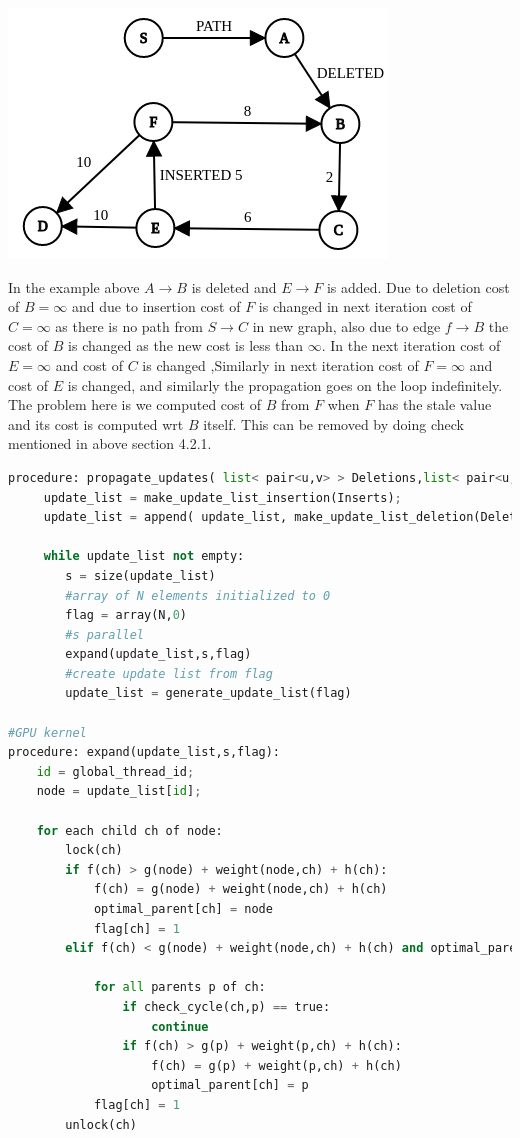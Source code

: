 \documentclass[a4paper]{article}
\begin{document}
\begin{center}
\includegraphics[scale=0.45]{img/prop_cycle.png}        
\end{center}

In the example above $A \rightarrow B$ is deleted and $E \rightarrow F$ is added. Due to deletion cost of $B = \infty$  and due to insertion cost of $F$ is changed in next iteration cost of $C = \infty$ as there is no path from $S \rightarrow C$ in new graph, also due to edge $f \rightarrow B$ the cost of $B$ is changed as the new cost is less than $\infty$. In the next iteration cost of $E = \infty$ and cost of $C$ is changed ,Similarly in next iteration cost of $F = \infty$ and cost of $E$ is changed, and similarly the propagation goes on the loop indefinitely. The problem here is we computed cost of $B$ from $F$ when $F$ has the stale value and its cost is computed wrt $B$ itself. This can be removed by doing check mentioned in above section 4.2.1. 

\begin{lstlisting}[language=python, caption=Propagation of Updates]
procedure: propagate_updates( list< pair<u,v> > Deletions,list< pair<u,v> > Inserts, E, N):
     update_list = make_update_list_insertion(Inserts);
     update_list = append( update_list, make_update_list_deletion(Deletions) )
     
     while update_list not empty:
        s = size(update_list)
        #array of N elements initialized to 0
        flag = array(N,0)
        #s parallel
        expand(update_list,s,flag)
        #create update list from flag
        update_list = generate_update_list(flag)

#GPU kernel
procedure: expand(update_list,s,flag):
    id = global_thread_id;
    node = update_list[id];
    
    for each child ch of node:
        lock(ch)
        if f(ch) > g(node) + weight(node,ch) + h(ch):
            f(ch) = g(node) + weight(node,ch) + h(ch)  
            optimal_parent[ch] = node
            flag[ch] = 1
        elif f(ch) < g(node) + weight(node,ch) + h(ch) and optimal_parent[ch] == node:
            
            for all parents p of ch:
                if check_cycle(ch,p) == true:
                    continue
                if f(ch) > g(p) + weight(p,ch) + h(ch):
                    f(ch) = g(p) + weight(p,ch) + h(ch)
                    optimal_parent[ch] = p
            flag[ch] = 1
        unlock(ch)
\end{lstlisting}
\end{document}
